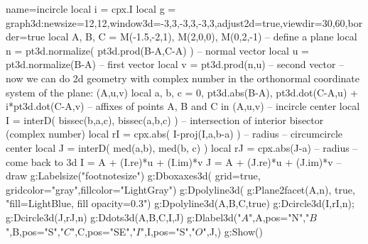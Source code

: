 \documentclass[12pt]{standalone}%
\begin{document}
\begin{luadraw}{name=incircle}
local i = cpx.I
local g = graph3d:new{size={12,12},window3d={-3,3,-3,3,-3,3},adjust2d=true,viewdir={30,60},border=true}
local A, B, C = M(-1.5,-2,1), M(2,0,0), M(0,2,-1) -- define a plane
local n = pt3d.normalize( pt3d.prod(B-A,C-A) ) -- normal vector 
local u = pt3d.normalize(B-A) -- first vector
local v = pt3d.prod(n,u) -- second vector
-- now we can do 2d geometry with complex number in the orthonormal coordinate system of the plane: (A,u,v)
local a, b, c = 0, pt3d.abs(B-A), pt3d.dot(C-A,u) + i*pt3d.dot(C-A,v) -- affixes of points A, B and C in (A,u,v)
-- incircle center
local I = interD( bissec(b,a,c), bissec(a,b,c) ) -- intersection of interior bisector (complex number)
local rI = cpx.abs( I-proj(I,{a,b-a}) ) -- radius
-- circumcircle center
local J = interD( med(a,b), med(b, c) )
local rJ = cpx.abs(J-a) -- radius
-- come back to 3d
I = A + (I.re)*u + (I.im)*v
J = A + (J.re)*u + (J.im)*v
-- draw
g:Labelsize("footnotesize")
g:Dboxaxes3d( {grid=true, gridcolor="gray",fillcolor="LightGray"})
g:Dpolyline3d( g:Plane2facet({A,n}), true, "fill=LightBlue, fill opacity=0.3")
g:Dpolyline3d({A,B,C},true)
g:Dcircle3d(I,rI,n); g:Dcircle3d(J,rJ,n)
g:Ddots3d({A,B,C,I,J})
g:Dlabel3d("$A$",A,{pos="N"},"$B$",B,{pos="S"},"$C$",C,{pos="SE"},"$I$",I,{pos="S"},"$O$",J,{})
g:Show()
\end{luadraw}
\end{document}
